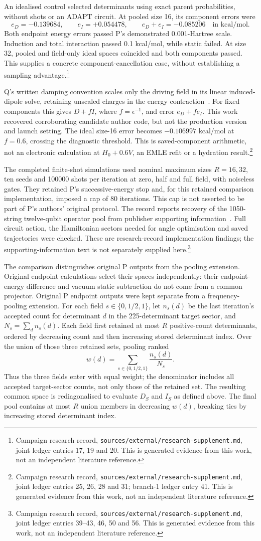 \documentclass{article}
\newcommand{\record}[1]{\footnote{Campaign research record, \texttt{sources/external/research-supplement.md}, #1. This is generated evidence from this work, not an independent literature reference.}}
\begin{document}
An idealised control selected determinants using exact parent probabilities, without shots or an ADAPT circuit. At pooled size 16, its component errors were
\[
 e_D=-0.139684,\qquad e_I=+0.054478,\qquad
 e_D+e_I=-0.085206
 \quad\text{in kcal/mol}.
\]
Both endpoint energy errors passed P's demonstrated 0.001-Hartree scale. Induction and total interaction passed 0.1 kcal/mol, while static failed. At size 32, pooled and field-only ideal spaces coincided and both components passed. This supplies a concrete component-cancellation case, without establishing a sampling advantage.\record{joint ledger entries 17, 19 and 20}

Q's written damping convention scales only the driving field in its linear induced-dipole solve, retaining unscaled charges in the energy contraction~\cite{Q}. For fixed components this gives \(D+fI\), where \(f=\epsilon^{-1}\), and error \(e_D+fe_I\). This work recovered corroborating candidate author code, but not the production version and launch setting. The ideal size-16 error becomes \(-0.106997\) kcal/mol at \(f=0.6\), crossing the diagnostic threshold. This is saved-component arithmetic, not an electronic calculation at \(H_0+0.6V\), an EMLE refit or a hydration result.\record{joint ledger entries 25, 26, 28 and 31; branch-1 ledger entry 41}

The completed finite-shot simulations used nominal maximum sizes \(R=16,32\), ten seeds and 100000 shots per iteration at zero, half and full field, with noiseless gates. They retained P's successive-energy stop and, for this retained comparison implementation, imposed a cap of 80 iterations. This cap is not asserted to be part of P's authors' original protocol. The record reports recovery of the 1050-string twelve-qubit operator pool from publisher supporting information~\cite{SI,SIfile}. Full circuit action, the Hamiltonian sectors needed for angle optimisation and saved trajectories were checked. These are research-record implementation findings; the supporting-information text is not separately supplied here.\record{joint ledger entries 39--43, 46, 50 and 56}

The comparison distinguishes original P outputs from the pooling extension. Original endpoint calculations select their spaces independently: their endpoint-energy difference and vacuum static subtraction do not come from a common projector. Original P endpoint outputs were kept separate from a frequency-pooling extension. For each field \(s\in\{0,1/2,1\}\), let \(n_s(d)\) be the last iteration's accepted count for determinant \(d\) in the 225-determinant target sector, and \(N_s=\sum_d n_s(d)\). Each field first retained at most \(R\) positive-count determinants, ordered by decreasing count and then increasing stored determinant index. Over the union of those three retained sets, pooling ranked
\[
 w(d)=\sum_{s\in\{0,1/2,1\}}\frac{n_s(d)}{N_s}.
\]
Thus the three fields enter with equal weight; the denominator includes all accepted target-sector counts, not only those of the retained set. The resulting common space is rediagonalised to evaluate \(D_S\) and \(I_S\) as defined above. The final pool contains at most \(R\) union members in decreasing \(w(d)\), breaking ties by increasing stored determinant index.
\end{document}
